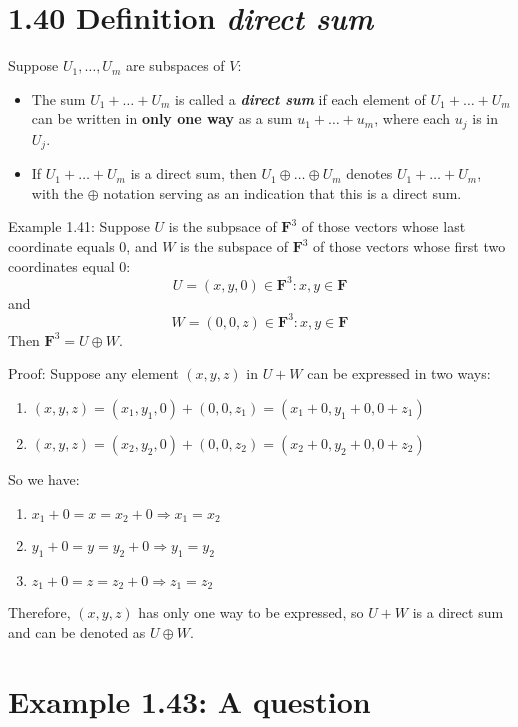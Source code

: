 \documentclass[12pt, letterpaper, oneside]{book}
\begin{document}
\section{1.40 Definition \textbf{\textit{direct sum}}}

Suppose $U_1, \ldots, U_m$ are subspaces of $V$:
\begin{itemize}
  \item The sum $U_1 + \ldots + U_m$ is called a \textbf{\textit{direct sum}}
    if each element of $U_1 + \ldots + U_m$ can be written in \textbf{only one
    way} as a sum $u_1 + \ldots + u_m$, where each $u_j$ is in $U_j$.
  \item If $U_1 + \ldots + U_m$ is a direct sum, then $U_1 \oplus \ldots \oplus
    U_m$ denotes $U_1 + \ldots + U_m$, with the $\oplus$ notation serving as an
    indication that this is a direct sum.
\end{itemize}

Example 1.41: Suppose $U$ is the subpsace of $\mathbf{F}^3$ of those vectors whose
last coordinate equals $0$, and $W$ is the subspace of $\mathbf{F}^3$ of those
vectors whose first two coordinates equal $0$:
\[
  U = {(x, y, 0) \in \mathbf{F}^3: x, y \in \mathbf{F}}
\]
and
\[
  W = {(0, 0, z) \in \mathbf{F}^3: x, y \in \mathbf{F}}
\]
Then $\mathbf{F}^3 = U \oplus W$.

Proof: Suppose any element $(x, y, z)$ in $U+W$ can be expressed in two ways:
\begin{enumerate}
  \item $(x, y, z) = (x_1, y_1, 0) + (0, 0, z_1) = (x_1 + 0, y_1 + 0, 0 + z_1)$
  \item $(x, y, z) = (x_2, y_2, 0) + (0, 0, z_2) = (x_2 + 0, y_2 + 0, 0 + z_2)$
\end{enumerate}

So we have:
\begin{enumerate}
  \item $x_1 + 0 = x = x_2 + 0 \Rightarrow x_1 = x_2$
  \item $y_1 + 0 = y = y_2 + 0 \Rightarrow y_1 = y_2$
  \item $z_1 + 0 = z = z_2 + 0 \Rightarrow z_1 = z_2$
\end{enumerate}

Therefore, $(x, y, z)$ has only one way to be expressed, so $U+W$ is a direct
sum and can be denoted as $U \oplus W$.

\section{Example 1.43: A question}
\end{document}
